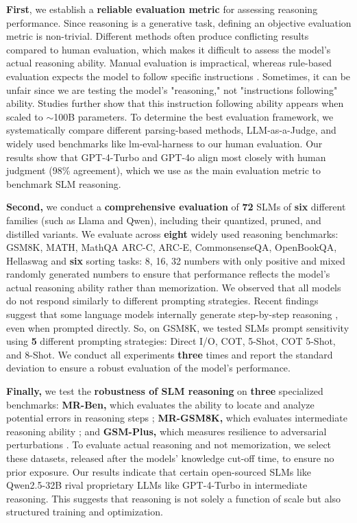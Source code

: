 \textbf{First}, we establish a \textbf{reliable evaluation metric} for assessing reasoning performance. Since reasoning is a generative task, defining an objective evaluation metric is non-trivial. Different methods often produce conflicting results compared to human evaluation, which makes it difficult to assess the model's actual reasoning ability. Manual evaluation is impractical, whereas rule-based evaluation expects the model to follow specific instructions \cite{huang2024largelanguagemodelsselfcorrect}. Sometimes, it can be unfair since we are testing the model's "reasoning," not "instructions following" ability. Studies \cite{wei2022finetunedlanguagemodelszeroshot} further show that this instruction following ability appears when scaled to $\sim$100B parameters. To determine the best evaluation framework, we systematically compare different parsing-based methods, LLM-as-a-Judge, and widely used benchmarks like lm-eval-harness to our human evaluation. Our results show that GPT-4-Turbo and GPT-4o align most closely with human judgment (98\% agreement), which we use as the main evaluation metric to benchmark SLM reasoning. 

\textbf{Second,} we conduct a \textbf{comprehensive evaluation} of \textbf{72} SLMs of \textbf{six} different families (such as Llama and Qwen), including their quantized, pruned, and distilled variants. We evaluate across \textbf{eight} widely used reasoning benchmarks: GSM8K, MATH, MathQA ARC-C, ARC-E, CommonsenseQA, OpenBookQA, Hellaswag and \textbf{six} sorting tasks: 8, 16, 32 numbers with only positive and mixed randomly generated numbers to ensure that performance reflects the model's actual reasoning ability rather than memorization. We observed that all models do not respond similarly to different prompting strategies. Recent findings \cite{plaat2024reasoning, qwen2025qwen25technicalreport, yang2024qwen2technicalreport} suggest that some language models internally generate step-by-step reasoning \cite{wei2022chain}, even when prompted directly. So, on GSM8K, we tested SLMs prompt sensitivity using \textbf{5} different prompting strategies: Direct I/O, COT, 5-Shot, COT 5-Shot, and 8-Shot. We conduct all experiments \textbf{three} times and report the standard deviation to ensure a robust evaluation of the model's performance. 

\textbf{Finally,} we test the \textbf{robustness of SLM reasoning} on \textbf{three} specialized benchmarks: \textbf{MR-Ben,} which evaluates the ability to locate and analyze potential errors in reasoning steps \cite{zeng2024mrbenmetareasoningbenchmarkevaluating}; \textbf{MR-GSM8K,} which evaluates intermediate reasoning ability \cite{zeng2024mrgsm8kmetareasoningbenchmarklarge}; and \textbf{GSM-Plus,} which measures resilience to adversarial perturbations \cite{li2024gsmpluscomprehensivebenchmarkevaluating}. To evaluate actual reasoning and not memorization, we select these datasets, released after the models' knowledge cut-off time, to ensure no prior exposure. Our results indicate that certain open-sourced SLMs like Qwen2.5-32B rival proprietary LLMs like GPT-4-Turbo in intermediate reasoning. This suggests that reasoning is not solely a function of scale but also structured training and optimization.


